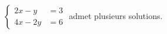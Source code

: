 $\begin{cases}2x-y &= 3 \\ 4x-2y &= 6\end{cases}$ admet plusieurs solutions.

\begin{reponses}
\end{reponses}

